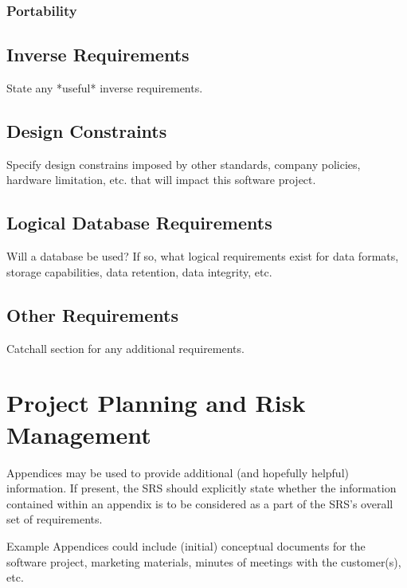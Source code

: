 \documentclass[titlepage]{article}
\begin{document}
\subsubsection{Portability}

\subsection{Inverse Requirements}
State any *useful* inverse requirements.

\subsection{Design Constraints}
Specify design constrains imposed by other standards, company policies, hardware limitation, etc. that will impact this software project.

\subsection{Logical Database Requirements}
Will a database be used?  If so, what logical requirements exist for data formats, storage capabilities, data retention, data integrity, etc.

\subsection{Other Requirements}
Catchall section for any additional requirements.

\section{Project Planning and Risk Management}

\begin{appendices}
Appendices may be used to provide additional (and hopefully helpful) information.  If present, the SRS should explicitly state whether the information contained within an appendix is to be considered as a part of the SRS’s overall set of requirements.

Example Appendices could include (initial) conceptual documents for the software project, marketing materials, minutes of meetings with the customer(s), etc.
\end{appendices}
\end{document}
